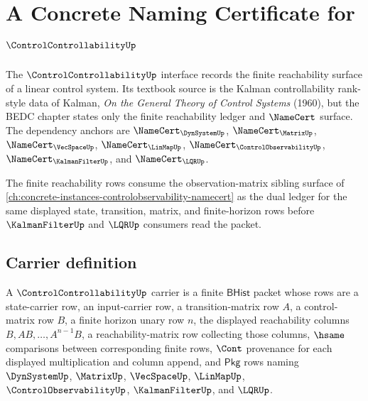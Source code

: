 \chapter{A Concrete Naming Certificate for $\ControlControllabilityUp$}
\label{ch:concrete-instances-controlcontrollability-namecert}

The $\ControlControllabilityUp$ interface records the finite reachability surface of a linear control system. Its textbook source is the Kalman controllability rank-style data of Kalman, \emph{On the General Theory of Control Systems} (1960), but the BEDC chapter states only the finite reachability ledger and $\NameCert$ surface. The dependency anchors are $\NameCert_{\DynSystemUp}$, $\NameCert_{\MatrixUp}$, $\NameCert_{\VecSpaceUp}$, $\NameCert_{\LinMapUp}$, $\NameCert_{\ControlObservabilityUp}$, $\NameCert_{\KalmanFilterUp}$, and $\NameCert_{\LQRUp}$.

The finite reachability rows consume the observation-matrix sibling surface of \autoref{ch:concrete-instances-controlobservability-namecert} as the dual ledger for the same displayed state, transition, matrix, and finite-horizon rows before $\KalmanFilterUp$ and $\LQRUp$ consumers read the packet.

\section{Carrier definition}
\label{sec:controlcontrollability-carrier}

\begin{definition}
\label{def:controlcontrollability-carrier}
A $\ControlControllabilityUp$ carrier is a finite $\mathsf{BHist}$ packet whose rows are a state-carrier row, an input-carrier row, a transition-matrix row $A$, a control-matrix row $B$, a finite horizon unary row $n$, the displayed reachability columns $B,AB,\ldots,A^{n-1}B$, a reachability-matrix row collecting those columns, $\hsame$ comparisons between corresponding finite rows, $\Cont$ provenance for each displayed multiplication and column append, and $\mathsf{Pkg}$ rows naming $\DynSystemUp$, $\MatrixUp$, $\VecSpaceUp$, $\LinMapUp$, $\ControlObservabilityUp$, $\KalmanFilterUp$, and $\LQRUp$.
\end{definition}

